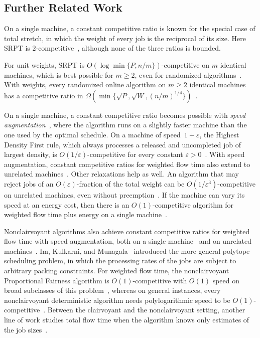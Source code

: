 \documentclass[11pt,letterpaper]{article}
\theoremstyle{definition}
\theoremstyle{remark}
\newcommand{\eps}{\varepsilon}
\begin{document}
\subsection{Further Related Work}

On a single machine, a constant competitive ratio is known for the special case of total stretch, in which the weight of every job is the reciprocal of its size. Here SRPT is $2$-competitive~\cite{MuthukrishnanRSG05}, although none of the three ratios is bounded.

For unit weights, SRPT is $O(\log\min\{P,n/m\})$-competitive on $m$ identical machines, which is best possible for $m\ge2$, even for randomized algorithms~\cite{LeonardiR07}. With weights, every randomized online algorithm on $m\ge2$ identical machines has a competitive ratio in $\Omega(\min\{\sqrt P,\sqrt W,(n/m)^{1/4}\})$~\cite{ChekuriKZ01}.

On a single machine, a constant competitive ratio becomes possible with \emph{speed augmentation}~\cite{KalyanasundaramP00,PhillipsSTW02}, where the algorithm runs on a slightly faster machine than the one used by the optimal schedule. On a machine of speed~$1+\eps$, the Highest Density First rule, which always processes a released and uncompleted job of largest density, is $O(1/\eps)$-competitive for every constant $\eps>0$~\cite{BecchettiLMP06}. With speed augmentation, constant competitive ratios for weighted flow time also extend to unrelated machines~\cite{ChadhaGKM09,AnandGK12,ChenIP25,JagerLZ26}. Other relaxations help as well. An algorithm that may reject jobs of an $O(\eps)$-fraction of the total weight can be $O(1/\eps^3)$-competitive on unrelated machines, even without preemption~\cite{LucarelliMTST18}. If the machine can vary its speed at an energy cost, then there is an $O(1)$-competitive algorithm for weighted flow time plus energy on a single machine~\cite{BansalPS09}.

Nonclairvoyant algorithms also achieve constant competitive ratios for weighted flow time with speed augmentation, both on a single machine~\cite{BansalD07} and on unrelated machines~\cite{ImKMP14}. Im, Kulkarni, and Munagala~\cite{ImKM18} introduced the more general polytope scheduling problem, in which the processing rates of the jobs are subject to arbitrary packing constraints. For weighted flow time, the nonclairvoyant Proportional Fairness algorithm is $O(1)$-competitive with $O(1)$ speed on broad subclasses of this problem~\cite{ImKM18}, whereas on general instances, every nonclairvoyant deterministic algorithm needs polylogarithmic speed to be $O(1)$-competitive~\cite{ImKM18}.
Between the clairvoyant and the nonclairvoyant setting, another line of work studies total flow time when the algorithm knows only estimates of the job sizes~\cite{AzarLT21,AzarLT22,GuptaKPW26,GuptaKLSY27}. 
\end{document}
